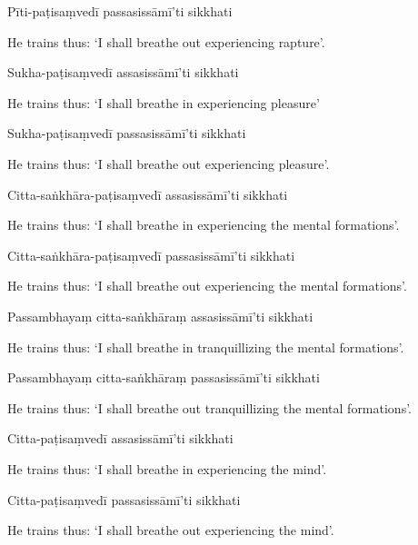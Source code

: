 Pīti-paṭisaṃvedī passasissāmī'ti sikkhati

\begin{english}
  He trains thus: `I shall breathe out experiencing rapture'.
\end{english}

Sukha-paṭisaṃvedī assasissāmī'ti sikkhati

\begin{english}
  He trains thus: `I shall breathe in experiencing pleasure'
\end{english}

Sukha-paṭisaṃvedī passasissāmī'ti sikkhati

\begin{english}
  He trains thus: `I shall breathe out experiencing pleasure'.
\end{english}

Citta-saṅkhāra-paṭisaṃvedī assasissāmī'ti sikkhati

\begin{english}
  He trains thus: `I shall breathe in experiencing the mental formations'.
\end{english}

Citta-saṅkhāra-paṭisaṃvedī passasissāmī'ti sikkhati

\begin{english}
  He trains thus: `I shall breathe out experiencing the mental formations'.
\end{english}

Passambhayaṃ citta-saṅkhāraṃ assasissāmī'ti sikkhati

\begin{english}
  He trains thus: `I shall breathe in tranquillizing the mental formations'.
\end{english}

Passambhayaṃ citta-saṅkhāraṃ passasissāmī'ti sikkhati

\begin{english}
  He trains thus: `I shall breathe out tranquillizing the mental formations'.
\end{english}

Citta-paṭisaṃvedī assasissāmī'ti sikkhati

\begin{english}
  He trains thus: `I shall breathe in experiencing the mind'.
\end{english}

Citta-paṭisaṃvedī passasissāmī'ti sikkhati

\begin{english}
  He trains thus: `I shall breathe out experiencing the mind'.
\end{english}

